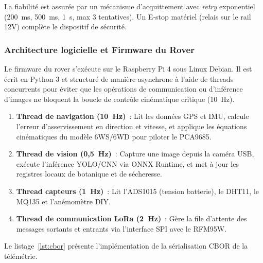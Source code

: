La fiabilité est assurée par un mécanisme d'acquittement avec \textit{retry} exponentiel (200~ms, 500~ms, 1~s, max 3 tentatives). Un E-stop matériel (relais sur le rail 12V) complète le dispositif de sécurité.

\subsubsection{Architecture logicielle et Firmware du Rover}

Le firmware du rover s'exécute sur le Raspberry Pi 4 sous Linux Debian. Il est écrit en Python 3 et structuré de manière asynchrone à l'aide de threads concurrents pour éviter que les opérations de communication ou d'inférence d'images ne bloquent la boucle de contrôle cinématique critique (10~Hz).

\begin{enumerate}
    \item \textbf{Thread de navigation (10~Hz)}~: Lit les données GPS et IMU, calcule l'erreur d'asservissement en direction et vitesse, et applique les équations cinématiques du modèle 6WS/6WD pour piloter le PCA9685.
    \item \textbf{Thread de vision (0{,}5~Hz)}~: Capture une image depuis la caméra USB, exécute l'inférence YOLO/CNN via ONNX Runtime, et met à jour les registres locaux de botanique et de sécheresse.
    \item \textbf{Thread capteurs (1~Hz)}~: Lit l'ADS1015 (tension batterie), le DHT11, le MQ135 et l'anémomètre DIY.
    \item \textbf{Thread de communication LoRa (2~Hz)}~: Gère la file d'attente des messages sortants et entrants via l'interface SPI avec le RFM95W.
\end{enumerate}

Le listage~\ref{lst:cbor} présente l'implémentation de la sérialisation CBOR de la télémétrie.

